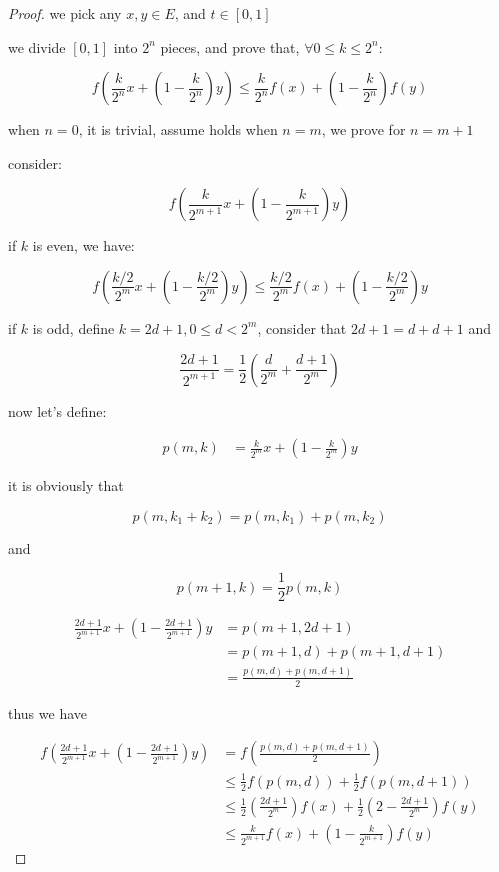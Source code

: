 \documentclass[11pt,a4paper]{article}
\begin{document}
\begin{proof}
    we pick any $x,y \in E$, and $t \in [0,1]$

    we divide $[0,1]$ into $2^n$ pieces, and prove that, $\forall 0 \le k \le 2^n$:

    \[
        f(\frac{k}{2^n}x + (1-\frac{k}{2^n})y) \le \frac{k}{2^n} f(x) + (1-\frac{k}{2^n})f(y)
    \]

    when $n=0$, it is trivial, assume holds when $n=m$, we prove for $n=m+1$ 

    consider:

    \[
        f(\frac{k}{2^{m+1}}x + (1-\frac{k}{2^{m+1}})y) 
    \]

    if $k$ is even, we have:


    \[
        f(\frac{k/2}{2^{m}}x + (1-\frac{k/2}{2^{m}})y) \le \frac{k/2}{2^m} f(x) + (1-\frac{k/2}{2^m})y
    \]

    if $k$ is odd, define $k= 2d + 1, 0 \le d < 2^m$, consider that $2d + 1 = d + d+1$ and

    \[
        \frac{2d+1}{2^{m+1}} = \frac{1}{2}\left(\frac{d}{2^m} + \frac{d+1}{2^m}  \right)
    \]

    now let's define:

    \begin{align*}
        p(m,k) & =  \frac{k}{2^{m}}x + (1-\frac{k}{2^{m}})y
    \end{align*}

    it is obviously that

    \[
        p(m,k_1 + k_2) = p(m,k_1) + p(m,k_2)
    \]

    and

    \[
        p(m+1,k) = \frac{1}{2}p(m,k)
    \]

    \begin{align*}
        \frac{2d+1}{2^{m+1}}x + (1-\frac{2d+1}{2^{m+1}})y &= p(m+1, 2d+1) \\
        &= p(m+1, d) + p(m+1, d+1)  \\
        &= \frac{p(m, d) + p(m,d+1)}{2}
    \end{align*}

    thus we have

    \begin{align*}
        f(\frac{2d+1}{2^{m+1}}x + (1-\frac{2d+1}{2^{m+1}})y) &= f(\frac{p(m, d) + p(m,d+1)}{2}) \\
        & \le \frac{1}{2}f(p(m,d)) + \frac{1}{2}f(p(m,d+1)) \\
        & \le \frac{1}{2} \left( \frac{2d+1}{2^m}\right)f(x) + \frac{1}{2} \left( 2-\frac{2d+1}{2^m}\right)f(y) \\
        & \le \frac{k}{2^{m+1}} f(x) + (1-\frac{k}{2^{m+1}})f(y)
    \end{align*}


\end{proof}
\end{document}
